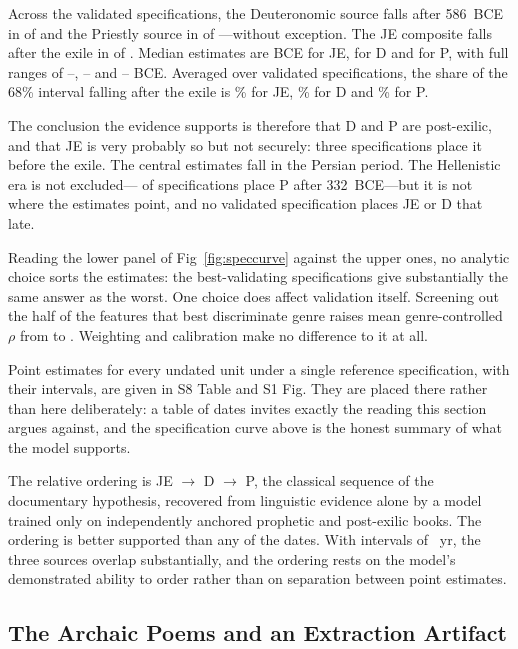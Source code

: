 \documentclass[10pt,letterpaper]{article}
\begin{document}
Across the \SPpass{} validated specifications, the Deuteronomic source falls
after 586~BCE in \SPDpost{} of \SPpass{} and the Priestly source in
\SPPpost{} of \SPpass---without exception.  The JE composite falls after the
exile in \SPJEpost{} of \SPpass.  Median estimates are \SPJEmed{} BCE for JE,
\SPDmed{} for D and \SPPmed{} for P, with full ranges of \SPJElo--\SPJEhi,
\SPDlo--\SPDhi{} and \SPPlo--\SPPhi{} BCE.  Averaged over validated
specifications, the share of the 68\% interval falling after the exile is
\SPJEmass\% for JE, \SPDmass\% for D and \SPPmass\% for P.

The conclusion the evidence supports is therefore that D and P are
post-exilic, and that JE is very probably so but not securely: three
specifications place it before the exile.  The central estimates fall in the
Persian period.  The Hellenistic era is not excluded---\SPPhell{} of \SPpass{}
specifications place P after 332~BCE---but it is not where the estimates point,
and no validated specification places JE or D that late.

Reading the lower panel of Fig~\ref{fig:speccurve} against the upper ones, no
analytic choice sorts the estimates: the best-validating specifications give
substantially the same answer as the worst.  One choice does affect validation
itself.  Screening out the half of the features that best discriminate genre
raises mean genre-controlled $\rho$ from \SPscreenAll{} to \SPscreenHalf.
Weighting and calibration make no difference to it at all.

Point estimates for every undated unit under a single reference
specification, with their intervals, are given in S8 Table and S1 Fig.  They
are placed there rather than here deliberately: a table of dates invites
exactly the reading this section argues against, and the specification curve
above is the honest summary of what the model supports.

The relative ordering is JE $\rightarrow$ D $\rightarrow$ P, the classical
sequence of the documentary hypothesis, recovered from linguistic evidence
alone by a model trained only on independently anchored prophetic and
post-exilic books.  The ordering is better supported than any of the dates.
With intervals of \SPPhalf~yr, the three sources overlap substantially, and the
ordering rests on the model's demonstrated ability to order rather than on
separation between point estimates.

\subsection*{The Archaic Poems and an Extraction Artifact}
\end{document}
